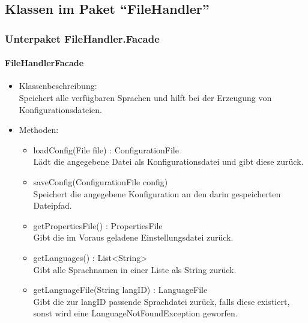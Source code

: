 \documentclass[parskip=full]{scrartcl}
\begin{document}
\subsection{Klassen im Paket \enquote{FileHandler}}

\subsubsection{Unterpaket FileHandler.Facade}
\paragraph{FileHandlerFacade}
\begin{itemize}
\item Klassenbeschreibung: \\
Speichert alle verfügbaren Sprachen und hilft bei der Erzeugung von Konfigurationsdateien.
\item Methoden: \\
\begin{itemize}
\item loadConfig(File file) : ConfigurationFile \\
Lädt die angegebene Datei als Konfigurationsdatei und gibt diese zurück.
\item saveConfig(ConfigurationFile config) \\
Speichert die angegebene Konfiguration an den darin gespeicherten Dateipfad.
\item getPropertiesFile() : PropertiesFile \\
Gibt die im Voraus geladene Einstellungsdatei zurück.
\item getLanguages() : List<String> \\
Gibt alle Sprachnamen in einer Liste als String zurück.
\item getLanguageFile(String langID) : LanguageFile \\
Gibt die zur langID passende Sprachdatei zurück, falls diese existiert,
sonst wird eine LanguageNotFoundException geworfen.
\end{itemize}
\end{itemize}
\end{document}
